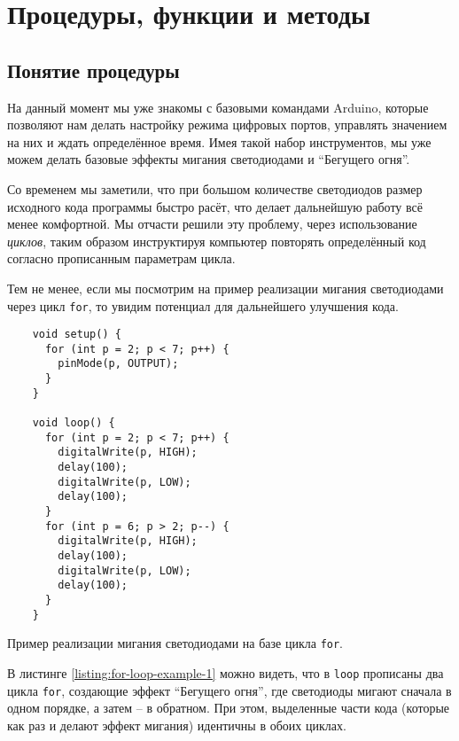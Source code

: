 \documentclass[../sparc.tex]{subfiles}
\begin{document}
\newpage
\section{Процедуры, функции и методы}

\subsection{Понятие процедуры}
На данный момент мы уже знакомы с базовыми командами Arduino, которые позволяют
нам делать настройку режима цифровых портов, управлять значением на них и ждать
определённое время.  Имея такой набор инструментов, мы уже можем делать базовые
эффекты мигания светодиодами и ``Бегущего огня''.

Со временем мы заметили, что при большом количестве светодиодов размер исходного
кода программы быстро расёт, что делает дальнейшую работу всё менее комфортной.
Мы отчасти решили эту проблему, через использование \emph{циклов}, таким образом
инструктируя компьютер повторять определённый код согласно прописанным
параметрам цикла.

Тем не менее, если мы посмотрим на пример реализации мигания светодиодами через
цикл \texttt{for}, то увидим потенциал для дальнейшего улучшения кода.

\begin{listing}[ht]
  \begin{verbatim}
    void setup() {
      for (int p = 2; p < 7; p++) {
        pinMode(p, OUTPUT);
      }
    }

    void loop() {
      for (int p = 2; p < 7; p++) {
        digitalWrite(p, HIGH);
        delay(100);
        digitalWrite(p, LOW);
        delay(100);
      }
      for (int p = 6; p > 2; p--) {
        digitalWrite(p, HIGH);
        delay(100);
        digitalWrite(p, LOW);
        delay(100);
      }
    }
  \end{verbatim}
  \label{listing:for-loop-example-1}
  \caption{Пример реализации мигания светодиодами на базе цикла \texttt{for}.}
\end{listing}

В листинге \ref{listing:for-loop-example-1} можно видеть, что в
\texttt{loop} прописаны два цикла \texttt{for}, создающие
эффект ``Бегущего огня'', где светодиоды мигают сначала в одном порядке, а затем
-- в обратном.  При этом, выделенные части кода (которые как раз и делают эффект
мигания) идентичны в обоих циклах.
\end{document}
